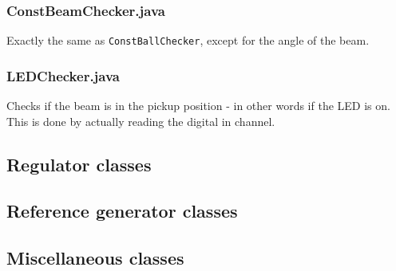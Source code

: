 \subsubsection{ConstBeamChecker.java}

Exactly the same as \texttt{ConstBallChecker}, except for the angle of the beam.

\subsubsection{LEDChecker.java}

Checks if the beam is in the pickup position - in other words if the LED is on. This is done by actually reading the digital in channel.

\subsection{Regulator classes}

\subsection{Reference generator classes}

\subsection{Miscellaneous classes} 	%




